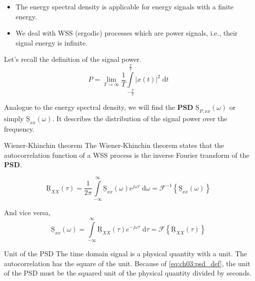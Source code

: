 \begin{refsection}
\begin{itemize}
	\item The energy spectral density is applicable for energy signals with a finite energy.
	\item We deal with \ac{WSS} (ergodic) processes which are power signals, i.e., their signal energy is infinite.
\end{itemize}

Let's recall the definition of the signal power.
\begin{equation}
	P = \lim\limits_{T \rightarrow \infty} \frac{1}{T} \int\limits_{-\frac{T}{2}}^{\frac{T}{2}} \left|x(t)\right|^2 \; \mathrm{d} t
\end{equation}

Analogue to the energy spectral density, we will find the  \textbf{\ac{PSD}} $\underline{\mathrm{S}}_{P,xx}(\omega)$ or simply $\underline{\mathrm{S}}_{xx}(\omega)$. It describes the distribution of the signal power over the frequency.

\begin{definition}{Wiener-Khinchin theorem}
	The  Wiener-Khinchin theorem states that the autocorrelation function of a \ac{WSS} process is the inverse Fourier transform of the  \textbf{\ac{PSD}}.
	
	\begin{equation}
		\underline{\mathrm{R}}_{XX}(\tau) = \frac{1}{2 \pi} \int\limits_{-\infty}^{\infty} \underline{\mathrm{S}}_{xx}(\omega) e^{j \omega \tau} \; \mathrm{d} \omega = \mathcal{F}^{-1} \left\{\underline{\mathrm{S}}_{xx}(\omega)\right\}
	\end{equation}
	
	And vice versa,
	\begin{equation}
		\underline{\mathrm{S}}_{xx}(\omega) = \int\limits_{-\infty}^{\infty} \underline{\mathrm{R}}_{XX}(\tau) e^{-j \omega \tau} \; \mathrm{d} \tau = \mathcal{F}\left\{\underline{\mathrm{R}}_{XX}(\tau)\right\}
		\label{eq:ch03:psd_def}
	\end{equation}
\end{definition}

\begin{excursus}{Unit of the \ac{PSD}}
	The time domain signal is a physical quantity with a unit. The autocorrelation has the square of the unit. Because of \eqref{eq:ch03:psd_def}, the unit of the \ac{PSD} must be the squared unit of the physical quantity divided by seconds.
	

\end{excursus}
\end{refsection}
